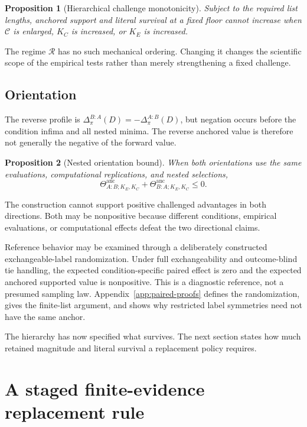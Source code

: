 \documentclass[11pt]{article}
\newcommand{\Regime}{\mathcal{R}}
\newcommand{\CSet}{\mathcal{C}}
\newcommand{\Thetaanc}{\Theta^{\mathrm{anc}}}
\newtheorem{proposition}{Proposition}
\theoremstyle{remark}
\begin{document}
\begin{proposition}[Hierarchical challenge monotonicity]
\label{prop:monotonicity}
Subject to the required list lengths, anchored support and literal survival at
a fixed floor cannot increase when $\CSet$ is enlarged, $K_C$ is increased, or
$K_E$ is increased.
\end{proposition}

The regime $\Regime$ has no such mechanical ordering. Changing it changes the
scientific scope of the empirical tests rather than merely strengthening a
fixed challenge.

\subsection{Orientation}

The reverse profile is
$\Delta^{B:A}_\pi(D)=-\Delta^{A:B}_\pi(D)$, but negation occurs before the
condition infima and all nested minima. The reverse anchored value is therefore
not generally the negative of the forward value.

\begin{proposition}[Nested orientation bound]
\label{prop:orientation}
When both orientations use the same evaluations, computational replications,
and nested selections,
\begin{equation}
\Thetaanc_{A:B;K_E,K_C}
+
\Thetaanc_{B:A;K_E,K_C}
\leq0.
\label{eq:orientation}
\end{equation}
\end{proposition}
The construction cannot support positive challenged advantages in both
directions. Both may be nonpositive because different conditions, empirical
evaluations, or computational effects defeat the two directional claims.

Reference behavior may be examined through a deliberately constructed
exchangeable-label randomization. Under full exchangeability and outcome-blind
tie handling, the expected condition-specific paired effect is zero and the
expected anchored supported value is nonpositive. This is a diagnostic
reference, not a presumed sampling law. Appendix~\ref{app:paired-proofs}
defines the randomization, gives the finite-list argument, and shows why
restricted label symmetries need not have the same anchor.

The hierarchy has now specified what survives. The next section states how
much retained magnitude and literal survival a replacement policy requires.


\section{A staged finite-evidence replacement rule}
\label{sec:decision}
\end{document}

